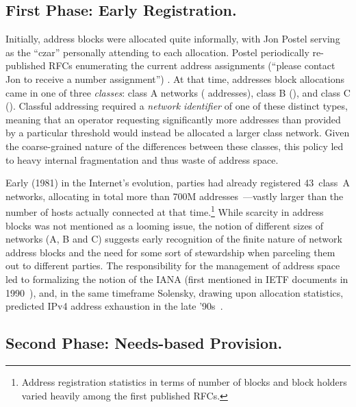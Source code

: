 \documentclass[letter]{sigcomm-alternate}
\begin{document}
\subsection{First Phase: Early Registration.}

Initially, address blocks were allocated quite informally, with Jon
Postel serving as the ``czar'' personally attending to each allocation.
Postel periodically re-published RFCs enumerating the current address
assignments (``please contact Jon to receive a number assignment'')
\cite{rfc790}. At that time, addresses block allocations came in one of
three \emph{classes}: class A networks ( addresses), class B
(), and class C ().  Classful addressing required a
\textit{network identifier} of one of these distinct types, meaning that an
operator requesting significantly more addresses than provided by a particular
threshold would instead be allocated a larger class network.  Given the
coarse-grained nature of the differences between these classes, this policy
led to heavy internal fragmentation and thus waste of address space.

Early (1981) in the Internet's evolution, parties had already registered
43~class~A networks, allocating in total more than 700M
addresses~\cite{rfc790}---vastly larger than the number of hosts actually
connected at that time.\footnote{
	Address registration statistics in terms of number of blocks and block 
	holders varied heavily among the first published RFCs.
}
While scarcity in address blocks was not mentioned as a looming issue, the
notion of different sizes of networks (A, B and C) suggests early
recognition of the finite nature of network address blocks and the need for
some sort of stewardship when parceling them out to different parties. The 
responsibility for the management of address space led to formalizing the 
notion of the IANA (first mentioned in IETF documents in 1990~\cite{rfc1060}),
and, in the same timeframe Solensky, drawing upon allocation statistics,
predicted IPv4 address exhaustion in the late '90s~\cite{solensky}.


\subsection{Second Phase: Needs-based Provision.}
\end{document}
